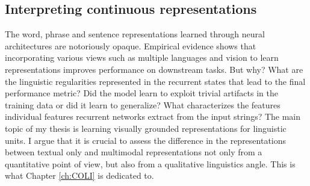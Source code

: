 \subsection{Interpreting continuous representations}
\label{sec:interpret}
The word, phrase and sentence representations learned through neural architectures are notoriously opaque.
Empirical evidence shows that incorporating various views such as multiple languages and vision to
learn representations improves performance on downstream tasks. But why? What are the linguistic
regularities represented in the recurrent states that lead to the final performance metric? Did the
model learn to exploit trivial artifacts in the training data or did it learn to generalize?
What characterizes the features individual features recurrent networks extract from the input strings?
The main topic of my thesis is learning visually grounded representations for linguistic units.
I argue that it is crucial to assess the difference in the representations between textual only
and multimodal representations not only from a quantitative point of view,
but also from a qualitative linguistics angle. This is what Chapter \ref{ch:COLI} is dedicated to.

